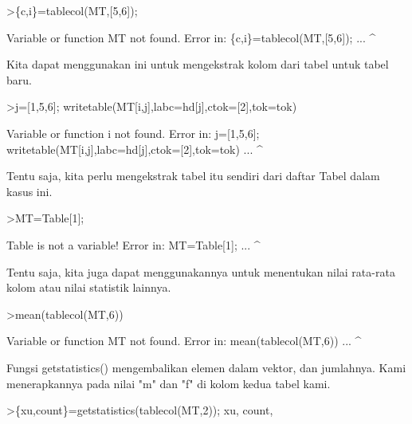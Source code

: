 \documentclass{article}
\begin{document}
\begin{eulernotebook}
\begin{eulercomment}
\begin{eulercomment}
\begin{eulerprompt}
>\{c,i\}=tablecol(MT,[5,6]);
\end{eulerprompt}
\begin{euleroutput}
  Variable or function MT not found.
  Error in:
  \{c,i\}=tablecol(MT,[5,6]); ...
                   ^
\end{euleroutput}
\begin{eulercomment}
Kita dapat menggunakan ini untuk mengekstrak kolom dari tabel untuk
tabel baru.
\end{eulercomment}
\begin{eulerprompt}
>j=[1,5,6]; writetable(MT[i,j],labc=hd[j],ctok=[2],tok=tok)
\end{eulerprompt}
\begin{euleroutput}
  Variable or function i not found.
  Error in:
  j=[1,5,6]; writetable(MT[i,j],labc=hd[j],ctok=[2],tok=tok) ...
                            ^
\end{euleroutput}
\begin{eulercomment}
Tentu saja, kita perlu mengekstrak tabel itu sendiri dari daftar Tabel
dalam kasus ini.
\end{eulercomment}
\begin{eulerprompt}
>MT=Table[1];
\end{eulerprompt}
\begin{euleroutput}
  Table is not a variable!
  Error in:
  MT=Table[1]; ...
             ^
\end{euleroutput}
\begin{eulercomment}
Tentu saja, kita juga dapat menggunakannya untuk menentukan nilai
rata-rata kolom atau nilai statistik lainnya.
\end{eulercomment}
\begin{eulerprompt}
>mean(tablecol(MT,6))
\end{eulerprompt}
\begin{euleroutput}
  Variable or function MT not found.
  Error in:
  mean(tablecol(MT,6)) ...
                  ^
\end{euleroutput}
\begin{eulercomment}
Fungsi getstatistics() mengembalikan elemen dalam vektor, dan
jumlahnya. Kami menerapkannya pada nilai "m" dan "f" di kolom kedua
tabel kami.
\end{eulercomment}
\begin{eulerprompt}
>\{xu,count\}=getstatistics(tablecol(MT,2)); xu, count,
\end{eulerprompt}
\begin{euleroutput}

\end{euleroutput}
\end{eulercomment}
\end{eulercomment}
\end{eulernotebook}
\end{document}
